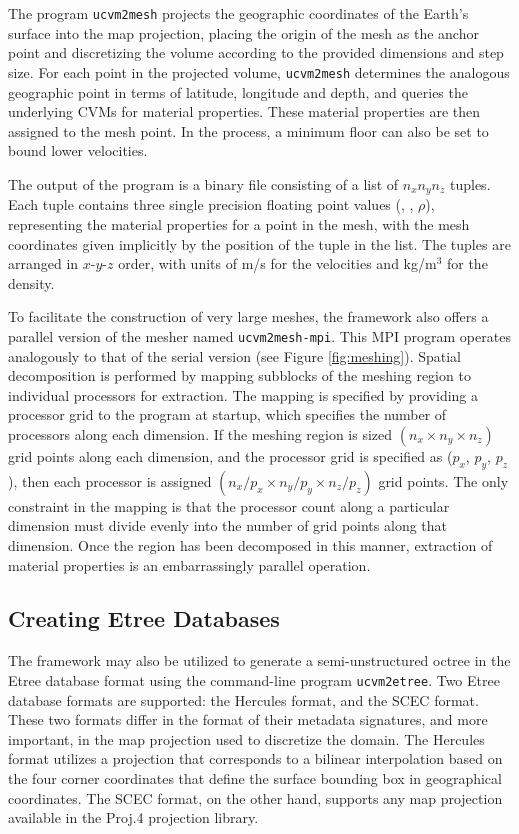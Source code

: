The program \texttt{ucvm2mesh} projects the geographic coordinates of the Earth's surface into the map projection, placing the origin of the mesh as the anchor point and discretizing the volume according to the provided dimensions and step size. For each point in the projected volume, \texttt{ucvm2mesh} determines the analogous geographic point in terms of latitude, longitude and depth, and queries the underlying CVMs for material properties. These material properties are then assigned to the mesh point. In the process, a minimum \vs{} floor can also be set to bound lower velocities.

The output of the program is a binary file consisting of a list of $n_xn_yn_z$ tuples. Each tuple contains three single precision floating point values (\vp{}, \vs{}, $\rho$), representing the material properties for a point in the mesh, with the mesh coordinates given implicitly by the position of the tuple in the list. The tuples are arranged in $x$-$y$-$z$ order, with units of m/s for the velocities and kg/m$^3$ for the density.

To facilitate the construction of very large meshes, the framework also offers a parallel version of the mesher named \texttt{ucvm2mesh-mpi}. This MPI program operates analogously to that of the serial version (see Figure \ref{fig:meshing}). Spatial decomposition is performed by mapping subblocks of the meshing region to individual processors for extraction. The mapping is specified by providing a processor grid to the program at startup, which specifies the number of processors along each dimension. If the meshing region is sized $(n_x \times n_y \times n_z)$ grid points along each dimension, and the processor grid is specified as ($p_x$, $p_y$, $p_z$), then each processor is assigned $(n_x/p_x \times n_y/p_y \times n_z/p_z)$ grid points. The only constraint in the mapping is that the processor count along a particular dimension must divide evenly into the number of grid points along that dimension. Once the region has been decomposed in this manner, extraction of material properties is an embarrassingly parallel operation.  



\subsection{Creating Etree Databases}

The framework may also be utilized to generate a semi-unstructured octree in the Etree database format \citep{Tu_2003_Tech} using the command-line program \texttt{ucvm2etree}. Two Etree database formats are supported: the Hercules format, and the SCEC format. These two formats differ in the format of their metadata signatures, and more important, in the map projection used to discretize the domain. The Hercules format utilizes a projection that corresponds to a bilinear interpolation based on the four corner coordinates that define the surface bounding box in geographical coordinates. The SCEC format, on the other hand, supports any map projection available in the Proj.4 projection library.

